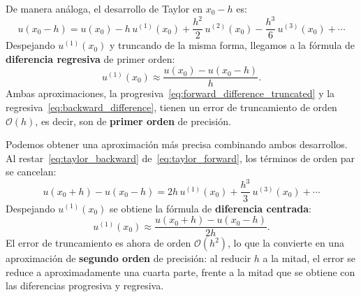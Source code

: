 De manera análoga, el desarrollo de Taylor en $x_0 - h$ es:
\begin{equation}
    u(x_0 - h) = u(x_0) - h\,u^{(1)}(x_{0}) + \frac{h^2}{2}\,u^{(2)}(x_{0}) - \frac{h^3}{6}\,u^{(3)}(x_{0}) + \cdots
    \label{eq:taylor_backward}
\end{equation}
Despejando $u^{(1)}(x_{0})$ y truncando de la misma forma, llegamos a la fórmula de \textbf{diferencia regresiva} de
primer orden:
\begin{equation}
    u^{(1)}(x_{0}) \approx \frac{u(x_0) - u(x_0 - h)}{h}.
    \label{eq:backward_difference}
\end{equation}
Ambas aproximaciones, la progresiva~\eqref{eq:forward_difference_truncated} y la
regresiva~\eqref{eq:backward_difference}, tienen un error de truncamiento de orden $\mathcal{O}(h)$, es decir, son de
\textbf{primer orden} de precisión.

Podemos obtener una aproximación más precisa combinando ambos desarrollos. Al restar~\eqref{eq:taylor_backward}
de~\eqref{eq:taylor_forward}, los términos de orden par se cancelan:
\begin{equation}
    u(x_0 + h) - u(x_0 - h) = 2h\,u^{(1)}(x_{0}) + \frac{h^3}{3}\,u^{(3)}(x_{0}) + \cdots
    \label{eq:taylor_centered}
\end{equation}
Despejando $u^{(1)}(x_{0})$ se obtiene la fórmula de \textbf{diferencia centrada}:
\begin{equation}
    u^{(1)}(x_{0}) \approx \frac{u(x_0 + h) - u(x_0 - h)}{2h}.
    \label{eq:centered_difference}
\end{equation}
El error de truncamiento es ahora de orden $\mathcal{O}(h^2)$, lo que la convierte en una aproximación de
\textbf{segundo orden} de precisión: al reducir $h$ a la mitad, el error se reduce a aproximadamente una cuarta parte,
frente a la mitad que se obtiene con las diferencias progresiva y regresiva.


